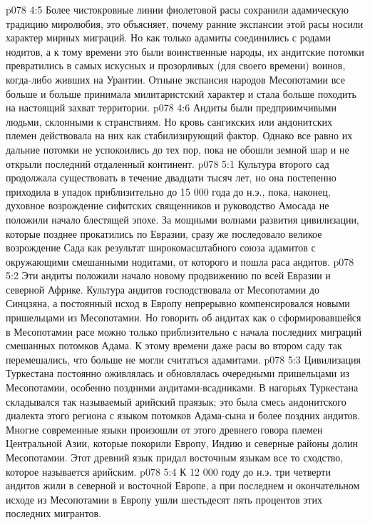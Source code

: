 \vs p078 4:5 \pc Более чистокровные линии фиолетовой расы сохранили адамическую традицию миролюбия, это объясняет, почему ранние экспансии этой расы носили характер мирных миграций. Но как только адамиты соединились с родами нодитов, а к тому времени это были воинственные народы, их андитские потомки превратились в самых искусных и прозорливых (для своего времени) воинов, когда\hyp{}либо живших на Урантии. Отныне экспансия народов Месопотамии все больше и больше принимала милитаристский характер и стала больше походить на настоящий захват территории.
\vs p078 4:6 Андиты были предприимчивыми людьми, склонными к странствиям. Но кровь сангикских или андонитских племен действовала на них как стабилизирующий фактор. Однако все равно их дальние потомки не успокоились до тех пор, пока не обошли земной шар и не открыли последний отдаленный континент.
\vs p078 5:1 Культура второго сад продолжала существовать в течение двадцати тысяч лет, но она постепенно приходила в упадок приблизительно до 15 000 года до н.э., пока, наконец, духовное возрождение сифитских священников и руководство Амосада не положили начало блестящей эпохе. За мощными волнами развития цивилизации, которые позднее прокатились по Евразии, сразу же последовало великое возрождение Сада как результат широкомасштабного союза адамитов с окружающими смешанными нодитами, от которого и пошла раса андитов.
\vs p078 5:2 Эти андиты положили начало новому продвижению по всей Евразии и северной Африке. Культура андитов господствовала от Месопотамии до Синцзяна, а постоянный исход в Европу непрерывно компенсировался новыми пришельцами из Месопотамии. Но говорить об андитах как о сформировавшейся в Месопотамии расе можно только приблизительно с начала последних миграций смешанных потомков Адама. К этому времени даже расы во втором саду так перемешались, что больше не могли считаться адамитами.
\vs p078 5:3 Цивилизация Туркестана постоянно оживлялась и обновлялась очередными пришельцами из Месопотамии, особенно поздними андитами\hyp{}всадниками. В нагорьях Туркестана складывался так называемый арийский праязык; это была смесь андонитского диалекта этого региона с языком потомков Адама\hyp{}сына и более поздних андитов. Многие современные языки произошли от этого древнего говора племен Центральной Азии, которые покорили Европу, Индию и северные районы долин Месопотамии. Этот древний язык придал восточным языкам все то сходство, которое называется арийским.
\vs p078 5:4 \pc К 12 000 году до н.э. три четверти андитов жили в северной и восточной Европе, а при последнем и окончательном исходе из Месопотамии в Европу ушли шестьдесят пять процентов этих последних мигрантов.
